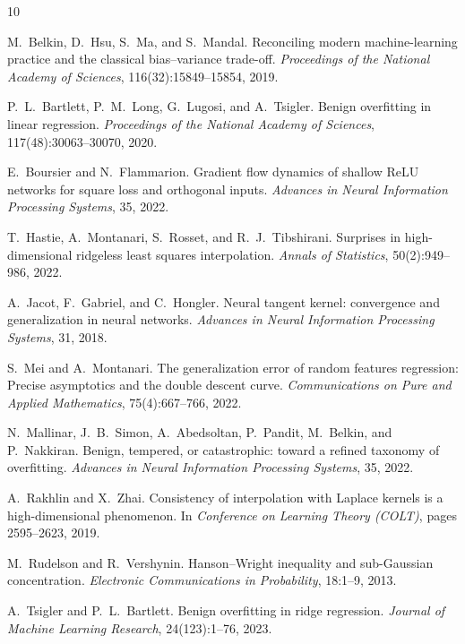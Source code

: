 \documentclass[12pt]{amsart}
\theoremstyle{definition}
\theoremstyle{remark}
\begin{document}
\begin{thebibliography}{10}

M.~Belkin, D.~Hsu, S.~Ma, and S.~Mandal.
\newblock Reconciling modern machine-learning practice and the classical
  bias--variance trade-off.
\newblock \emph{Proceedings of the National Academy of Sciences},
  116(32):15849--15854, 2019.

P.~L.~Bartlett, P.~M.~Long, G.~Lugosi, and A.~Tsigler.
\newblock Benign overfitting in linear regression.
\newblock \emph{Proceedings of the National Academy of Sciences},
  117(48):30063--30070, 2020.

E.~Boursier and N.~Flammarion.
\newblock Gradient flow dynamics of shallow {ReLU} networks for square loss and
  orthogonal inputs.
\newblock \emph{Advances in Neural Information Processing Systems}, 35, 2022.

T.~Hastie, A.~Montanari, S.~Rosset, and R.~J.~Tibshirani.
\newblock Surprises in high-dimensional ridgeless least squares interpolation.
\newblock \emph{Annals of Statistics}, 50(2):949--986, 2022.

A.~Jacot, F.~Gabriel, and C.~Hongler.
\newblock Neural tangent kernel: convergence and generalization in neural
  networks.
\newblock \emph{Advances in Neural Information Processing Systems}, 31, 2018.

S.~Mei and A.~Montanari.
\newblock The generalization error of random features regression: Precise
  asymptotics and the double descent curve.
\newblock \emph{Communications on Pure and Applied Mathematics},
  75(4):667--766, 2022.

N.~Mallinar, J.~B.~Simon, A.~Abedsoltan, P.~Pandit, M.~Belkin, and
  P.~Nakkiran.
\newblock Benign, tempered, or catastrophic: toward a refined taxonomy of
  overfitting.
\newblock \emph{Advances in Neural Information Processing Systems}, 35, 2022.

A.~Rakhlin and X.~Zhai.
\newblock Consistency of interpolation with {L}aplace kernels is a
  high-dimensional phenomenon.
\newblock In \emph{Conference on Learning Theory (COLT)}, pages 2595--2623, 2019.

M.~Rudelson and R.~Vershynin.
\newblock Hanson--{W}right inequality and sub-{G}aussian concentration.
\newblock \emph{Electronic Communications in Probability}, 18:1--9, 2013.

A.~Tsigler and P.~L.~Bartlett.
\newblock Benign overfitting in ridge regression.
\newblock \emph{Journal of Machine Learning Research}, 24(123):1--76, 2023.

\end{thebibliography}
\end{document}
